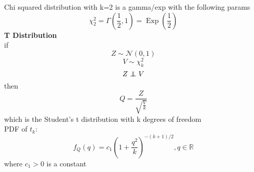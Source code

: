 \documentclass[twocolumn]{amsart}
\newcommand{\Exp}{\operatorname{Exp}}
\newcommand\independent{\protect\mathpalette{\protect\independenT}{\perp}}
\def\independenT#1#2{\mathrel{\rlap{$#1#2$}\mkern3mu{#1#2}}}
\begin{document}
Chi squared distribution with k=2 is a gamma/exp with the following params
\begin{equation*}
  \chi_{2}^{2} = \Gamma(\frac{1}{2},1) = \Exp(\frac{1}{2})
\end{equation*}
\textbf{T Distribution} \\
if
\begin{equation*}
  Z \sim \mathcal{N}(0, 1)
\end{equation*}
\begin{equation*}
  V \sim \chi_{k}^{2}
\end{equation*}
\begin{equation*}
  Z \independent V
\end{equation*}
then
\begin{equation*}
  Q = \frac{Z}{\sqrt{\frac{V}{k}}}
\end{equation*}
which is the Student's t distribution with k degrees of freedom \\
PDF of \(t_{k}\):
\begin{equation*}
  f_{Q}(q) = c_{1}{(1+\frac{q^{2}}{k})}^{-(k+1)/2}, q \in \mathbb{R}
\end{equation*}
where \(c_{1}>0\) is a constant

\end{document}
